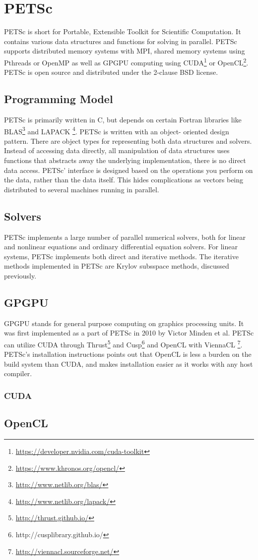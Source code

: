 \section{PETSc}

PETSc is short for Portable, Extensible Toolkit for Scientific Computation. 
It contains various data structures and functions for 
solving  in parallel. PETSc supports distributed 
memory systems with MPI, shared memory systems using Pthreads or OpenMP as well 
as GPGPU computing using CUDA\footnote{\url{https://developer.nvidia.com/cuda-toolkit}} 
or OpenCL\footnote{\url{https://www.khronos.org/opencl/}}. PETSc is open source and distributed 
under the 2-clause BSD license\cite{petsc-web-page}.

\subsection{Programming Model}

PETSc is primarily written in C, but depends on certain Fortran libraries like 
BLAS\footnote{\url{http://www.netlib.org/blas/}} and LAPACK
\footnote{\url{http://www.netlib.org/lapack/}}. PETSc is written with an object-
oriented design pattern. There are object types for representing both data structures 
and solvers. Instead of accessing data directly, all manipulation of data structures 
uses functions that abstracts away the underlying implementation, there is no direct 
data access. PETSc' interface is designed based on the operations you perform on 
the data, rather than the data itself. This hides complications as vectors being 
distributed to several machines running in parallel.

\subsection{Solvers}

PETSc implements a large number of parallel numerical solvers, both for linear and 
nonlinear equations and ordinary differential equation solvers. For linear systems, 
PETSc implements both direct and iterative methods. The iterative methods implemented 
in PETSc are Krylov subsspace methods, discussed previously.

\subsection{GPGPU}

GPGPU stands for general purpose computing on graphics processing units. It was 
first implemented as a part of PETSc in 2010\cite{minden2010preliminary} by Victor 
Minden et al. PETSc can utilize CUDA through Thrust\footnote{\url{http://thrust.github.io/}} 
and Cusp\footnote{http://cusplibrary.github.io/} and OpenCL with ViennaCL
\footnote{\url{http://viennacl.sourceforge.net/}}. PETSc's installation instructions 
points out that OpenCL is less a burden on the build system than CUDA, and makes 
installation easier as it works with any host compiler. 

\subsubsection{CUDA}

\subsection{OpenCL}

